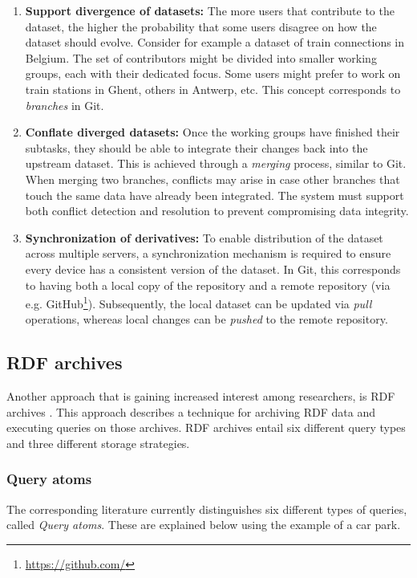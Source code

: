 \begin{enumerate}
    \item \textbf{Support divergence of datasets:} The more users that contribute to the dataset, the higher the probability that some users disagree on how the dataset should evolve. Consider for example a dataset of train connections in Belgium. The set of contributors might be divided into smaller working groups, each with their dedicated focus. Some users might prefer to work on train stations in Ghent, others in Antwerp, etc. This concept corresponds to \emph{branches} in Git.
    
    \item \textbf{Conflate diverged datasets:} Once the working groups have finished their subtasks, they should be able to integrate their changes back into the upstream dataset. This is achieved through a \emph{merging} process, similar to Git. When merging two branches, conflicts may arise in case other branches that touch the same data have already been integrated. The system must support both conflict detection and resolution to prevent compromising data integrity.
    
    \item \textbf{Synchronization of derivatives:} To enable distribution of the dataset across multiple servers, a synchronization mechanism is required to ensure every device has a consistent version of the dataset. In Git, this corresponds to having both a local copy of the repository and a remote repository (via e.g. GitHub\footnote{\url{https://github.com/}}). Subsequently, the local dataset can be updated via \emph{pull} operations, whereas local changes can be \emph{pushed} to the remote repository.
\end{enumerate}

\subsection{RDF archives}
Another approach that is gaining increased interest among researchers, is RDF archives \cite{rdfarchives,rdfquerytypes}. This approach describes a technique for archiving RDF data and executing queries on those archives. RDF archives entail six different query types and three different storage strategies.

\subsubsection{Query atoms}
The corresponding literature currently distinguishes six different types of queries, called \emph{Query atoms}. These are explained below using the example of a car park.

